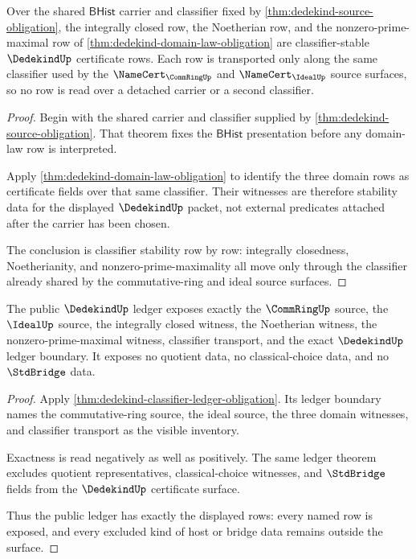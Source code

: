 \begin{theorem}\label{thm:dedekind-certificate-stability-rows}
Over the shared $\mathsf{BHist}$ carrier and classifier fixed by \autoref{thm:dedekind-source-obligation}, the integrally closed row, the Noetherian row, and the nonzero-prime-maximal row of \autoref{thm:dedekind-domain-law-obligation} are classifier-stable $\DedekindUp$ certificate rows. Each row is transported only along the same classifier used by the $\NameCert_{\CommRingUp}$ and $\NameCert_{\IdealUp}$ source surfaces, so no row is read over a detached carrier or a second classifier.
\end{theorem}
\begin{proof}
Begin with the shared carrier and classifier supplied by \autoref{thm:dedekind-source-obligation}. That theorem fixes the $\mathsf{BHist}$ presentation before any domain-law row is interpreted.

Apply \autoref{thm:dedekind-domain-law-obligation} to identify the three domain rows as certificate fields over that same classifier. Their witnesses are therefore stability data for the displayed $\DedekindUp$ packet, not external predicates attached after the carrier has been chosen.

The conclusion is classifier stability row by row: integrally closedness, Noetherianity, and nonzero-prime-maximality all move only through the classifier already shared by the commutative-ring and ideal source surfaces.
\end{proof}

\begin{theorem}\label{thm:dedekind-exact-ledger-public-surface}
The public $\DedekindUp$ ledger exposes exactly the $\CommRingUp$ source, the $\IdealUp$ source, the integrally closed witness, the Noetherian witness, the nonzero-prime-maximal witness, classifier transport, and the exact $\DedekindUp$ ledger boundary. It exposes no quotient data, no classical-choice data, and no $\StdBridge$ data.
\end{theorem}
\begin{proof}
Apply \autoref{thm:dedekind-classifier-ledger-obligation}. Its ledger boundary names the commutative-ring source, the ideal source, the three domain witnesses, and classifier transport as the visible inventory.

Exactness is read negatively as well as positively. The same ledger theorem excludes quotient representatives, classical-choice witnesses, and $\StdBridge$ fields from the $\DedekindUp$ certificate surface.

Thus the public ledger has exactly the displayed rows: every named row is exposed, and every excluded kind of host or bridge data remains outside the surface.
\end{proof}

